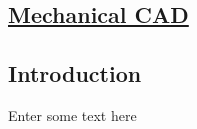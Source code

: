 
\vspace*{8.5cm}

\begin{flushright}
	\section{\huge{\underline{Mechanical CAD}}}
\end{flushright}

\subsection{Introduction}
	Enter some text here
